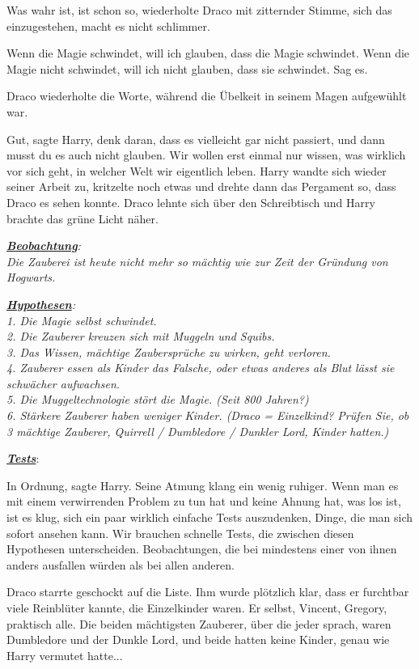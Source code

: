 \glqq Was wahr ist, ist schon so\grqq{}, wiederholte Draco mit zitternder
Stimme, \glqq sich das einzugestehen, macht es nicht schlimmer.\grqq{}

\glqq Wenn die Magie schwindet, will ich glauben, dass die Magie schwindet. Wenn
die Magie nicht schwindet, will ich nicht glauben, dass sie schwindet. Sag
es.\grqq{}

Draco wiederholte die Worte, während die Übelkeit in seinem Magen aufgewühlt
war.

\glqq Gut\grqq{}, sagte Harry, \glqq denk daran, dass es vielleicht gar nicht
passiert, und dann musst du es auch nicht glauben. Wir wollen erst einmal nur
wissen, was wirklich vor sich geht, in welcher Welt wir eigentlich leben.\grqq{}
Harry wandte sich wieder seiner Arbeit zu, kritzelte noch etwas und drehte dann
das Pergament so, dass Draco es sehen konnte. Draco lehnte sich über den
Schreibtisch und Harry brachte das grüne Licht näher.

\emph{\textbf{\underline{Beobachtung}}:\\
Die Zauberei ist heute nicht mehr so mächtig wie zur Zeit der Gründung von
Hogwarts.}

\emph{\textbf{\underline{Hypothesen}}:}\\
\emph{1. Die Magie selbst schwindet.\\
2. Die Zauberer kreuzen sich mit Muggeln und Squibs.\\
3. Das Wissen, mächtige Zaubersprüche zu wirken, geht verloren.\\
4. Zauberer essen als Kinder das Falsche, oder etwas anderes als Blut lässt sie
schwächer aufwachsen.\\
5. Die Muggeltechnologie stört die Magie. (Seit 800 Jahren?) \\
6. Stärkere Zauberer haben weniger Kinder. (Draco = Einzelkind? Prüfen Sie, ob 3
mächtige Zauberer, Quirrell / Dumbledore / Dunkler Lord, Kinder hatten.) }

\textbf{\emph{\underline{Tests}}}:

\glqq In Ordnung\grqq{}, sagte Harry. Seine Atmung klang ein wenig ruhiger.
\glqq Wenn man es mit einem verwirrenden Problem zu tun hat und keine Ahnung
hat, was los ist, ist es klug, sich ein paar wirklich einfache Tests
auszudenken, Dinge, die man sich sofort ansehen kann. Wir brauchen schnelle
Tests, die zwischen diesen Hypothesen unterscheiden. Beobachtungen, die bei
mindestens einer von ihnen anders ausfallen würden als bei allen anderen.\grqq{}

Draco starrte geschockt auf die Liste. Ihm wurde plötzlich klar, dass er
furchtbar viele Reinblüter kannte, die Einzelkinder waren. Er selbst, Vincent,
Gregory, praktisch alle. Die beiden mächtigsten Zauberer, über die jeder sprach,
waren Dumbledore und der Dunkle Lord, und beide hatten keine Kinder, genau wie
Harry vermutet hatte...

